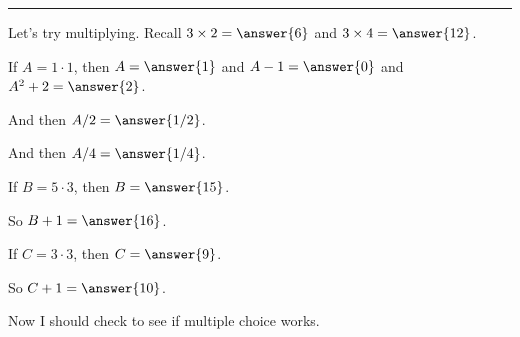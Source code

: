 \documentclass{ximera}
\begin{document}
\hrule

\begin{problem}
  Let's try multiplying.  Recall $3 \times 2 = \answer{6}$ and $3 \times 4 = \answer{12}$.
  
  \begin{problem}
    If $A = 1 \cdot 1$, then $A = \answer{1}$ and $A - 1 = \answer{0}$ and $A^2 + 2= \answer{2}$.
    
    \begin{problem}
      And then $A/2 = \answer{1/2}$.
      
      \begin{problem}
        And then $A/4 = \answer{1/4}$.
      \end{problem}
    \end{problem}
  \end{problem}
  
  \begin{problem}
    If $B = 5 \cdot 3$, then $B = \answer{15}$.
    
    \begin{problem}
      So $B + 1 = \answer{16}$.
    \end{problem}
  \end{problem}
  
  \begin{problem}
    If $C = 3 \cdot 3$, then $C = \answer{9}$.
    
    \begin{problem}
      So $C + 1 = \answer{10}$.
    \end{problem}
  \end{problem}
  
\end{problem}

Now I should check to see if multiple choice works.
\end{document}
